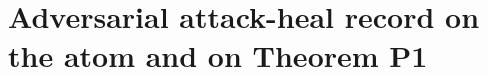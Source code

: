 %

\providecommand{\ClaimStatusTheorem}{\textsc{[Theorem]}}
\providecommand{\ClaimStatusConjectured}{\textsc{[Conjectured]}}
\providecommand{\ClaimStatusHeuristic}{\textsc{[Heuristic]}}
\providecommand{\ClaimStatusRetracted}{\textsc{[Retracted]}}
\providecommand{\ClaimStatusDefinition}{\textsc{[Definition]}}
\providecommand{\ClaimStatusScoped}{\textsc{[Scoped]}}
\providecommand{\ZZ}{\mathbb{Z}}
\providecommand{\QQ}{\mathbb{Q}}
\providecommand{\CC}{\mathbb{C}}
\providecommand{\NN}{\mathbb{N}}
\providecommand{\fg}{\mathfrak{g}}
\providecommand{\Ran}{\mathrm{Ran}}
\providecommand{\Conf}{\mathrm{Conf}}
\providecommand{\Sym}{\mathrm{Sym}}
\providecommand{\Bord}{B^{\mathrm{ord}}}
\providecommand{\BSig}{B^{\Sigma}}
\providecommand{\av}{\mathrm{av}}
\providecommand{\FM}{\mathrm{FM}}
\providecommand{\KZ}{\mathrm{KZ}}
\providecommand{\KZB}{\mathrm{KZB}}
\providecommand{\Moduli}{\overline{M}}
\providecommand{\Loc}{\mathrm{loc}}
\providecommand{\Glob}{\mathrm{glob}}
\providecommand{\dlog}{d{\log}}
\providecommand{\ChirAlg}{\mathrm{ChirAlg}}
\providecommand{\FactAlg}{\mathrm{FactAlg}}
\providecommand{\Coh}{\mathrm{Coh}}
\providecommand{\dGLA}{\mathrm{dGLA}}

\section{Adversarial attack-heal record on the atom and on Theorem P1}
\label{wn:sec:wave17-opus-atom}

